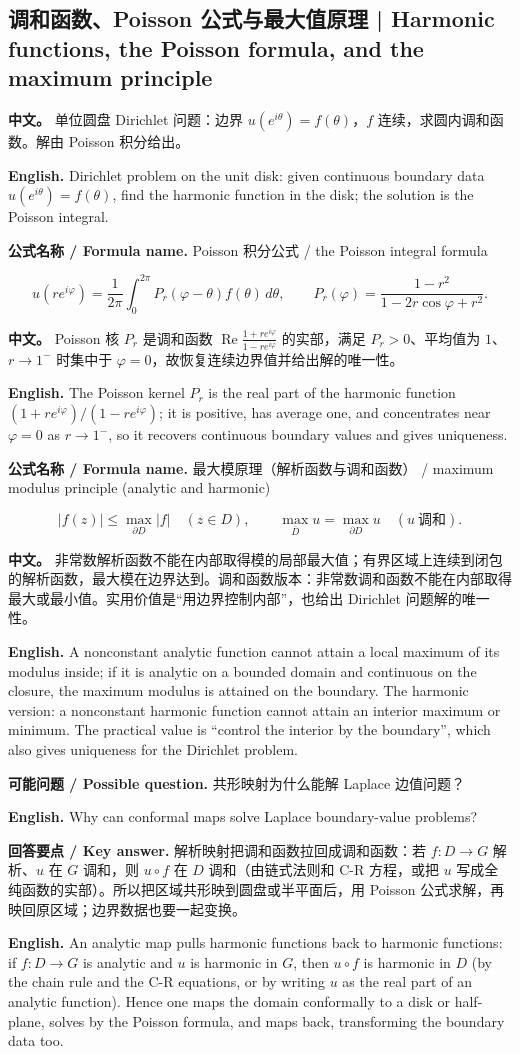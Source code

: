 \documentclass[UTF8,11pt,a4paper]{ctexart}
\newcommand{\EN}[1]{\par\noindent \textbf{English.} #1\par}
\newcommand{\FORMULA}[2]{\par\noindent\textbf{公式名称 / Formula name.} #1 / #2\par}
\newcommand{\ASK}[4]{\par\noindent \textbf{可能问题 / Possible question.} #1\par\EN{#2}\noindent \textbf{回答要点 / Key answer.} #3\par\EN{#4}\medskip}
\newcommand{\APS}[2]{\par\noindent\textbf{中文。} #1\par\noindent\textbf{English.} #2\par\smallskip}
\begin{document}
\subsection{调和函数、Poisson 公式与最大值原理 | Harmonic functions, the Poisson formula, and the maximum principle}
\APS{单位圆盘 Dirichlet 问题：边界 $u(e^{i\theta})=f(\theta)$，$f$ 连续，求圆内调和函数。解由 Poisson 积分给出。}{Dirichlet problem on the unit disk: given continuous boundary data $u(e^{i\theta})=f(\theta)$, find the harmonic function in the disk; the solution is the Poisson integral.}
\FORMULA{Poisson 积分公式}{the Poisson integral formula}
\[
u(re^{i\varphi})=\frac1{2\pi}\int_0^{2\pi}P_r(\varphi-\theta)f(\theta)\,d\theta,\qquad
P_r(\varphi)=\frac{1-r^2}{1-2r\cos\varphi+r^2}.
\]
\APS{Poisson 核 $P_r$ 是调和函数 $\operatorname{Re}\frac{1+re^{i\varphi}}{1-re^{i\varphi}}$ 的实部，满足 $P_r>0$、平均值为 $1$、$r\to1^-$ 时集中于 $\varphi=0$，故恢复连续边界值并给出解的唯一性。}{The Poisson kernel $P_r$ is the real part of the harmonic function $(1+re^{i\varphi})/(1-re^{i\varphi})$; it is positive, has average one, and concentrates near $\varphi=0$ as $r\to1^-$, so it recovers continuous boundary values and gives uniqueness.}
\FORMULA{最大模原理（解析函数与调和函数）}{maximum modulus principle (analytic and harmonic)}
\[
|f(z)|\le\max_{\partial D}|f|\quad(z\in D),\qquad
\max_{\overline D}u=\max_{\partial D}u\quad(u\ \text{调和}).
\]
\APS{非常数解析函数不能在内部取得模的局部最大值；有界区域上连续到闭包的解析函数，最大模在边界达到。调和函数版本：非常数调和函数不能在内部取得最大或最小值。实用价值是“用边界控制内部”，也给出 Dirichlet 问题解的唯一性。}{A nonconstant analytic function cannot attain a local maximum of its modulus inside; if it is analytic on a bounded domain and continuous on the closure, the maximum modulus is attained on the boundary. The harmonic version: a nonconstant harmonic function cannot attain an interior maximum or minimum. The practical value is ``control the interior by the boundary'', which also gives uniqueness for the Dirichlet problem.}

\ASK{共形映射为什么能解 Laplace 边值问题？}{Why can conformal maps solve Laplace boundary-value problems?}{解析映射把调和函数拉回成调和函数：若 $f:D\to G$ 解析、$u$ 在 $G$ 调和，则 $u\circ f$ 在 $D$ 调和（由链式法则和 C-R 方程，或把 $u$ 写成全纯函数的实部）。所以把区域共形映到圆盘或半平面后，用 Poisson 公式求解，再映回原区域；边界数据也要一起变换。}{An analytic map pulls harmonic functions back to harmonic functions: if $f:D\to G$ is analytic and $u$ is harmonic in $G$, then $u\circ f$ is harmonic in $D$ (by the chain rule and the C-R equations, or by writing $u$ as the real part of an analytic function). Hence one maps the domain conformally to a disk or half-plane, solves by the Poisson formula, and maps back, transforming the boundary data too.}
\end{document}
